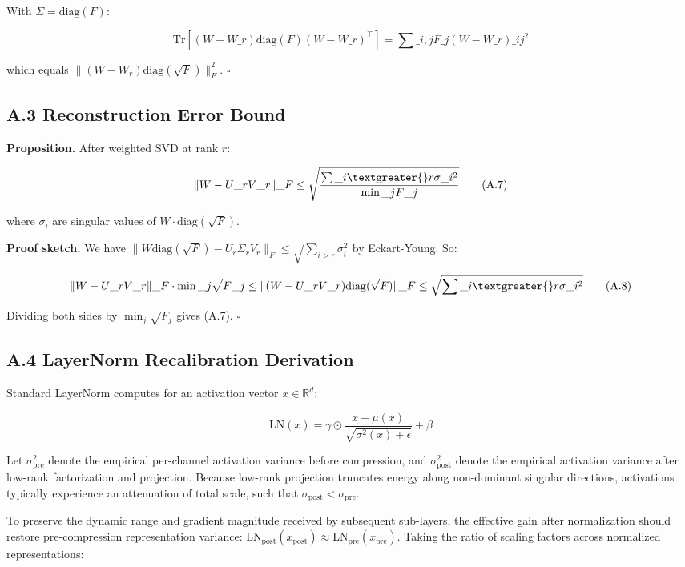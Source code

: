 With $\Sigma = \mathrm{diag}(F)$:

\[
\mathrm{Tr}[(W - W\_r) \mathrm{diag}(F) (W - W\_r)^\top] = \sum\_{i, j} F\_j (W - W\_r)\_{ij}^2
\tag{A.6}
\]

which equals $\|(W - W_r) \mathrm{diag}(\sqrt{F})\|_F^2$. $\square$

\subsection{A.3 Reconstruction Error Bound}

\textbf{Proposition.} After weighted SVD at rank $r$:

\[
\|W - U\_r V\_r\|\_F \leq \sqrt{\frac{\sum\_{i \textgreater{} r} \sigma\_i^2}{\min\_j F\_j}}
\tag{A.7}
\]

where $\sigma_i$ are singular values of $W \cdot \mathrm{diag}(\sqrt{F})$.

\textbf{Proof sketch.} We have $\|W \mathrm{diag}(\sqrt{F}) - U_r \Sigma_r V_r\|_F \leq \sqrt{\sum_{i > r} \sigma_i^2}$ by Eckart-Young. So:

\[
\|W - U\_r V\_r\|\_F \cdot \min\_j \sqrt{F\_j} \leq \|(W - U\_r V\_r) \mathrm{diag}(\sqrt{F})\|\_F \leq \sqrt{\sum\_{i \textgreater{} r} \sigma\_i^2}
\tag{A.8}
\]

Dividing both sides by $\min_j \sqrt{F_j}$ gives (A.7). $\square$

\subsection{A.4 LayerNorm Recalibration Derivation}

Standard LayerNorm computes for an activation vector $x \in \mathbb{R}^d$:

\[
\mathrm{LN}(x) = \gamma \odot \frac{x - \mu(x)}{\sqrt{\sigma^2(x) + \epsilon}} + \beta
\tag{A.9}
\]

Let $\sigma_{\mathrm{pre}}^2$ denote the empirical per-channel activation variance before compression, and $\sigma_{\mathrm{post}}^2$ denote the empirical activation variance after low-rank factorization and projection. Because low-rank projection truncates energy along non-dominant singular directions, activations typically experience an attenuation of total scale, such that $\sigma_{\mathrm{post}} < \sigma_{\mathrm{pre}}$.

To preserve the dynamic range and gradient magnitude received by subsequent sub-layers, the effective gain after normalization should restore pre-compression representation variance: $\mathrm{LN}_{\mathrm{post}}(x_{\mathrm{post}}) \approx \mathrm{LN}_{\mathrm{pre}}(x_{\mathrm{pre}})$. Taking the ratio of scaling factors across normalized representations:

